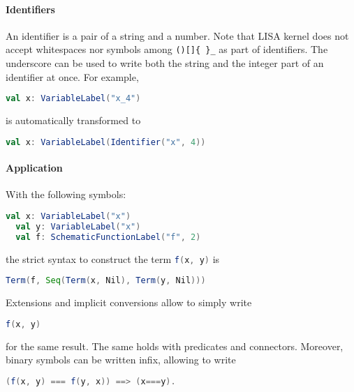 \paragraph{Identifiers}
An identifier is a pair of a string and a number. Note that LISA kernel does not accept whitespaces nor symbols among \lstinline|()[]{ }_| as part of identifiers. The underscore can be used to write both the string and the integer part of an identifier at once. For example, 

\begin{lstlisting}[language=Scala]
  val x: VariableLabel("x_4")
\end{lstlisting}

is automatically transformed to 

\begin{lstlisting}[language=Scala]
  val x: VariableLabel(Identifier("x", 4))
\end{lstlisting}

\paragraph{Application}
With the following symbols:
\begin{lstlisting}[language=Scala]
  val x: VariableLabel("x")
  val y: VariableLabel("x")
  val f: SchematicFunctionLabel("f", 2)
\end{lstlisting}
the strict syntax to construct the term \lstinline[language=Scala]|f(x, y)| is
\begin{lstlisting}[language=Scala]
  Term(f, Seq(Term(x, Nil), Term(y, Nil)))
\end{lstlisting}
Extensions and implicit conversions allow to simply write 
\begin{lstlisting}[language=Scala]
  f(x, y)
\end{lstlisting}
for the same result. The same holds with predicates and connectors. Moreover, binary symbols can be written infix, allowing to write

\begin{lstlisting}[language=Scala]
  (f(x, y) === f(y, x)) ==> (x===y).
\end{lstlisting}

